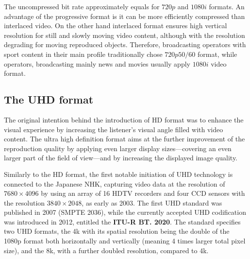 %
The uncompressed bit rate approximately equals for $720p$ and $1080i$ formats.
An advantage of the progressive format is it can be more efficiently compressed than interlaced video.
On the other hand interlaced format ensures high vertical resolution for still and slowly moving video content, although with the resolution degrading for moving reproduced objects.
Therefore, broadcasting operators with sport content in their main profile traditionally chose $720p50/60$ format, while operators, broadcasting mainly news and movies usually apply $1080i$ video format.



\subsection{The UHD format}

The original intention behind the introduction of HD format was to enhance the visual experience by increasing the listener's visual angle filled with video content.
The ultra high definition format aims at the further improvement of the reproduction quality by applying even larger display sizes---covering an even larger part of the field of view---and by increasing the displayed image quality.

Similarly to the HD format, the first notable initiation of UHD technology is connected to the Japanese NHK, capturing video data at the resolution of $7680 \times 4096$ by using an array of 16 HDTV recorders and four CCD sensors with the resolution $3840 \times 2048$, as early as 2003.
The first UHD standard was published in 2007 (SMPTE 2036), while the currently accepted UHD codification was introduced in 2012, entitled the \textbf{ITU-R BT. 2020}.
The standard specifies two UHD formats, the 4k with its spatial resolution being the double of the 1080p format both horizontally and vertically (meaning 4 times larger total pixel size), and the 8k, with a further  doubled resolution, compared to 4k.

